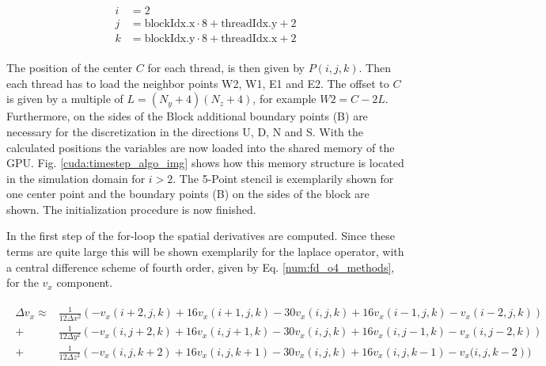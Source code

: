 \begin{align}
    \begin{split}
    i &= 2\\
    j &= \text{blockIdx.x}\cdot 8 + \text{threadIdx.y} + 2\\
    k &= \text{blockIdx.y}\cdot 8 + \text{threadIdx.x} + 2
    \end{split}
\end{align}

The position of the center $C$ for each thread, is then given by $P(i, j, k)$.
Then each thread has to load the neighbor points W2, W1, E1 and E2.
The offset to $C$ is given by a multiple of ${L=(N_y+4)(N_z+4)}$, for example ${W2= C - 2L}$.
Furthermore, on the sides of the Block additional boundary points (B) are necessary for the discretization
in the directions U, D, N and S.
With the calculated positions the variables are now loaded into the shared memory of the GPU.
Fig. \ref{cuda:timestep_algo_img} shows how this memory structure is located in the simulation domain  for $i>2$.
The 5-Point stencil is exemplarily shown for one center point and the boundary points (B) on the sides of the block are shown.
The initialization procedure is now finished.

In the first step of the for-loop the spatial derivatives are computed.
Since these terms are quite large this will be shown exemplarily for the laplace operator,
with a central difference scheme of fourth order, given by Eq. \ref{num:fd_o4_methods}, for the $v_x$ component.

\begin{align}
    \begin{split}
    \Delta v_x   \approx &  \frac{1}{12\Delta x^2} \left(-v_x(i+2, j, k) + 16v_x(i+1, j, k) - 30v_x(i, j, k) + 16v_x(i-1, j, k)-v_x(i-2, j, k)\right)\\
                              +&  \frac{1}{12\Delta y^2} \left(-v_x(i, j+2, k) + 16v_x(i, j+1, k) - 30v_x(i, j, k) + 16v_x(i, j-1, k)-v_x(i, j-2, k)\right)\\
                              +&  \frac{1}{12\Delta z^2} \left(-v_x(i, j, k+2) + 16v_x(i, j, k+1) - 30v_x(i, j, k) + 16v_x(i, j, k-1)-v_x(i, j, k-2\right))
    \end{split}
\end{align}

